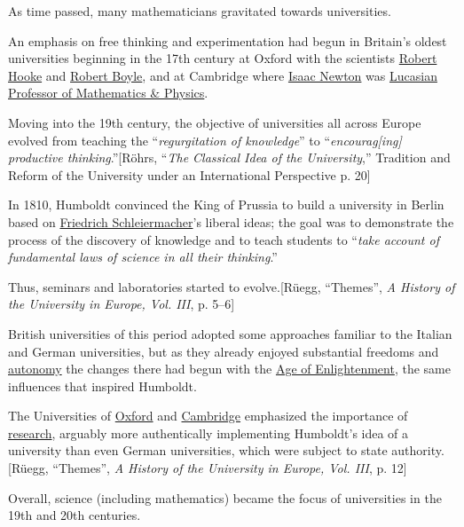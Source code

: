 \documentclass{book}
\numberwithin{equation}{section}
\begin{document}
%
As time passed, many mathematicians gravitated towards universities.

An emphasis on free thinking and experimentation had begun in Britain's oldest universities beginning in the 17th century at Oxford with the scientists \href{https://en.wikipedia.org/wiki/Robert_Hooke}{Robert Hooke} and \href{https://en.wikipedia.org/wiki/Robert_Boyle}{Robert Boyle}, and at Cambridge where \href{https://en.wikipedia.org/wiki/Isaac_Newton}{Isaac Newton} was \href{https://en.wikipedia.org/wiki/Lucasian_Professor_of_Mathematics}{Lucasian Professor of Mathematics \& Physics}.

Moving into the 19th century, the objective of universities all across Europe evolved from teaching the ``\textit{regurgitation of knowledge}'' to ``\textit{encourag[ing] productive thinking}.''[Röhrs, ``\textit{The Classical Idea of the University},'' Tradition and Reform of the University under an International Perspective p. 20]

In 1810, Humboldt convinced the King of Prussia to build a university in Berlin based on \href{https://en.wikipedia.org/wiki/Friedrich_Schleiermacher}{Friedrich Schleiermacher}'s liberal ideas; the goal was to demonstrate the process of the discovery of knowledge and to teach students to ``\textit{take account of fundamental laws of science in all their thinking}.''

Thus, seminars and laboratories started to evolve.[Rüegg, ``Themes'', \textit{A History of the University in Europe, Vol. III}, p. 5--6]

%
British universities of this period adopted some approaches familiar to the Italian and German universities, but as they already enjoyed substantial freedoms and \href{https://en.wikipedia.org/wiki/Autonomy}{autonomy} the changes there had begun with the \href{https://en.wikipedia.org/wiki/Age_of_Enlightenment}{Age of Enlightenment}, the same influences that inspired Humboldt.

The Universities of \href{https://en.wikipedia.org/wiki/University_of_Oxford}{Oxford} and \href{https://en.wikipedia.org/wiki/University_of_Cambridge}{Cambridge} emphasized the importance of \href{https://en.wikipedia.org/wiki/Research}{research}, arguably more authentically implementing Humboldt's idea of a university than even German universities, which were subject to state authority.[Rüegg, ``Themes'', \textit{A History of the University in Europe, Vol. III}, p. 12]

Overall, science (including mathematics) became the focus of universities in the 19th and 20th centuries.
\end{document}
